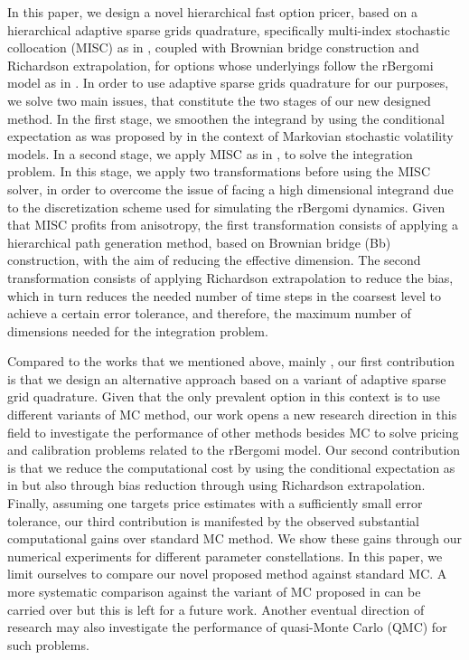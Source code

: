 In this paper,  we design a novel hierarchical fast option pricer,  based on a  hierarchical adaptive sparse grids quadrature, specifically  multi-index stochastic collocation (MISC) as in  \cite{haji2016multi}, coupled with Brownian bridge construction and Richardson extrapolation, for options whose underlyings  follow the rBergomi model as in \cite{bayer2016pricing}.  In order to use adaptive sparse grids quadrature for our purposes, we  solve two main issues, that constitute the two stages of our new designed method. In the first stage, we smoothen the integrand by using the conditional expectation as was proposed by \cite{romano1997contingent} in the context of Markovian stochastic volatility  models.   In a second stage, we apply  MISC as in \cite{haji2016multi}, to solve the integration problem. In this stage, we apply two transformations before using the MISC solver, in order to overcome the issue of facing a high dimensional integrand due to the discretization scheme used for simulating the rBergomi dynamics. Given that MISC profits from anisotropy, the first transformation consists of applying a hierarchical  path generation method, based on Brownian
bridge (Bb) construction, with the aim of reducing the effective dimension. The second transformation consists of applying Richardson extrapolation to reduce the bias, which in turn reduces the needed number of time steps in the coarsest level to achieve a certain error tolerance, and therefore,  the maximum number of dimensions needed for the integration problem.

Compared to the works that we mentioned above, mainly \cite{mccrickerd2017turbocharging}, our first contribution is that we design an alternative approach based on a variant of adaptive sparse grid quadrature. Given that the only prevalent option in this context is to use different variants of MC method, our work opens a new  research direction in this field to investigate the performance of other methods besides MC to solve pricing and calibration problems related to the rBergomi model. Our second contribution is that we reduce the computational cost  by using the conditional expectation as in \cite{mccrickerd2017turbocharging} but also through bias reduction through using Richardson extrapolation. Finally, assuming one targets price estimates with a sufficiently small  error tolerance, our third contribution is manifested by the observed substantial computational gains  over standard MC method. We show  these gains through our numerical experiments for  different parameter constellations. In this paper, we limit ourselves to compare our novel proposed method against standard MC. A more systematic comparison against the variant of MC proposed in \cite{mccrickerd2017turbocharging}  can be carried over but this is left for a future work. Another eventual direction of research may also investigate the performance of quasi-Monte Carlo (QMC) for such problems.


